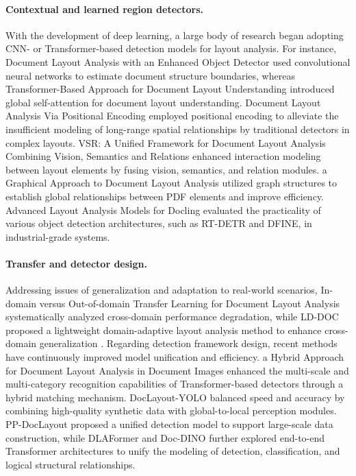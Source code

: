 \paragraph{Contextual and learned region detectors.}
With the development of deep learning, a large body of research began adopting CNN- or Transformer-based detection models for layout analysis. For instance, Document Layout Analysis with an Enhanced Object Detector \cite{minouei2021enhancedobjectdetector} used convolutional neural networks to estimate document structure boundaries, whereas Transformer-Based Approach for Document Layout Understanding \cite{yang2022transformerlayout} introduced global self-attention for document layout understanding. Document Layout Analysis Via Positional Encoding \cite{zhou2022positionalencodinglayout} employed positional encoding to alleviate the insufficient modeling of long-range spatial relationships by traditional detectors in complex layouts. VSR: A Unified Framework for Document Layout Analysis Combining Vision, Semantics and Relations \cite{zhang2021vsr} enhanced interaction modeling between layout elements by fusing vision, semantics, and relation modules. a Graphical Approach to Document Layout Analysis \cite{wang2023graphicallayout} utilized graph structures to establish global relationships between PDF elements and improve efficiency. Advanced Layout Analysis Models for Docling \cite{livathinos2025docling} evaluated the practicality of various object detection architectures, such as RT-DETR and DFINE, in industrial-grade systems.

\paragraph{Transfer and detector design.}
Addressing issues of generalization and adaptation to real-world scenarios, In-domain versus Out-of-domain Transfer Learning for Document Layout Analysis \cite{li2024indomain} systematically analyzed cross-domain performance degradation, while LD-DOC proposed a lightweight domain-adaptive layout analysis method to enhance cross-domain generalization \cite{gao2024lddoc}. Regarding detection framework design, recent methods have continuously improved model unification and efficiency. a Hybrid Approach for Document Layout Analysis in Document Images \cite{hybrid_dla_2024} enhanced the multi-scale and multi-category recognition capabilities of Transformer-based detectors through a hybrid matching mechanism. DocLayout-YOLO \cite{doclayout_yolo_2024} balanced speed and accuracy by combining high-quality synthetic data with global-to-local perception modules. PP-DocLayout \cite{pp_doclayout_2025} proposed a unified detection model to support large-scale data construction, while DLAFormer \cite{dlaformer_2024} and Doc-DINO \cite{doc_dino_2024} further explored end-to-end Transformer architectures to unify the modeling of detection, classification, and logical structural relationships.

